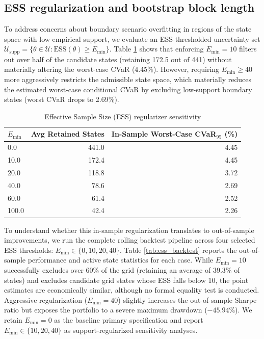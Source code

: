 \documentclass[smallcondensed]{svjour3}
\begin{document}
\subsection{ESS regularization and bootstrap block length}
To address concerns about boundary scenario overfitting in regions of the state space with low empirical support, we evaluate an ESS-thresholded uncertainty set $\mathcal{U}_{\text{supp}} = \{\theta \in \mathcal{U} : \text{ESS}(\theta) \ge E_{\min}\}$. Table \ref{tab:sens_ess} shows that enforcing $E_{\min} = 10$ filters out over half of the candidate states (retaining 172.5 out of 441) without materially altering the worst-case CVaR (4.45\%). However, requiring $E_{\min} \ge 40$ more aggressively restricts the admissible state space, which materially reduces the estimated worst-case conditional CVaR by excluding low-support boundary states (worst CVaR drops to 2.69\%).

\begin{table}[!htbp]
\centering
\caption{Effective Sample Size (ESS) regularizer sensitivity}
\label{tab:sens_ess}
\begin{tabular}{lrr}
\toprule
$E_{\min}$ & \textbf{Avg Retained States} & \textbf{In-Sample Worst-Case CVaR$_{95}$ (\%)} \\
\midrule
0.0 & 441.0 & 4.45 \\
10.0 & 172.4 & 4.45 \\
20.0 & 118.8 & 3.72 \\
40.0 & 78.6 & 2.69 \\
60.0 & 61.4 & 2.52 \\
100.0 & 42.4 & 2.26 \\
\bottomrule
\end{tabular}
\end{table}



To understand whether this in-sample regularization translates to out-of-sample improvements, we run the complete rolling backtest pipeline across four selected ESS thresholds: $E_{\min} \in \{0, 10, 20, 40\}$. Table \ref{tab:ess_backtest} reports the out-of-sample performance and active state statistics for each case. While $E_{\min}=10$ successfully excludes over 60\% of the grid (retaining an average of 39.3\% of states) and excludes candidate grid states whose ESS falls below 10, the point estimates are economically similar, although no formal equality test is conducted. Aggressive regularization ($E_{\min}=40$) slightly increases the out-of-sample Sharpe ratio but exposes the portfolio to a severe maximum drawdown ($-45.94\%$). We retain $E_{\min}=0$ as the baseline primary specification and report $E_{\min}\in\{10,20,40\}$ as support-regularized sensitivity analyses.
\end{document}
